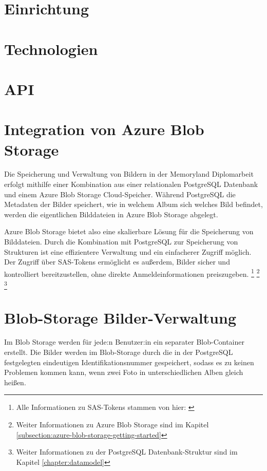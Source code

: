 
\section{Einrichtung}


\section{Technologien}


\section{API}


\section{Integration von Azure Blob Storage}

Die Speicherung und Verwaltung von Bildern in der Memoryland Diplomarbeit erfolgt 
mithilfe einer Kombination aus einer relationalen PostgreSQL Datenbank und einem 
Azure Blob Storage Cloud-Speicher. Während PostgreSQL die Metadaten der Bilder 
speichert, wie in welchem Album sich welches Bild befindet, werden die 
eigentlichen Bilddateien in Azure Blob Storage abgelegt.

Azure Blob Storage bietet also eine skalierbare Lösung für die Speicherung 
von Bilddateien. Durch die Kombination mit PostgreSQL zur Speicherung von Strukturen 
ist eine effizientere Verwaltung und ein einfacherer Zugriff möglich. Der Zugriff 
über SAS-Tokens ermöglicht es au\ss{}erdem, Bilder sicher und kontrolliert bereitzustellen, 
ohne direkte Anmeldeinformationen preiszugeben.
\footnote{Alle Informationen zu SAS-Tokens stammen von hier: \cite{MicrosoftCorporationa}}
\footnote{Weiter Informationen zu Azure Blob Storage sind im Kapitel \ref{subsection:azure-blob-storage-getting-started}}
\footnote{Weiter Informationen zu der PostgreSQL Datenbank-Struktur sind im Kapitel \ref{chapter:datamodel}}

\section{Blob-Storage Bilder-Verwaltung}

Im Blob Storage werden für jede:n Benutzer:in ein separater Blob-Container erstellt. 
Die Bilder werden im Blob-Storage durch die in der PostgreSQL festgelegten eindeutigen
Identifikationsnummer gespeichert, sodass es zu keinen Problemen kommen kann, wenn zwei
Foto in unterschiedlichen Alben gleich hei\ss{}en.


